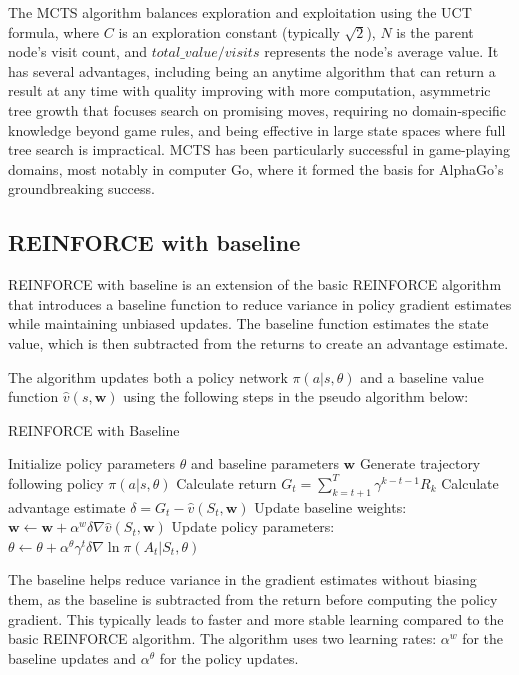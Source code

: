 \documentclass{article}
\begin{document}
The MCTS algorithm balances exploration and exploitation using the UCT formula, where $C$ is an exploration constant (typically $\sqrt{2}$), $N$ is the parent node's visit count, and $total\_value/visits$ represents the node's average value. 
It has several advantages, including being an anytime algorithm that can return a result at any time with quality improving with more computation, asymmetric tree growth that focuses search on promising moves, requiring no domain-specific knowledge beyond game rules, and being effective in large state spaces where full tree search is impractical. 
MCTS has been particularly successful in game-playing domains, most notably in computer Go, where it formed the basis for AlphaGo's groundbreaking success.



\subsection{REINFORCE with baseline}

REINFORCE with baseline is an extension of the basic REINFORCE algorithm that introduces a baseline function to reduce variance in policy gradient estimates while maintaining unbiased updates.
The baseline function estimates the state value, which is then subtracted from the returns to create an advantage estimate.

The algorithm updates both a policy network $\pi(a|s,\theta)$ and a baseline value function $\hat{v}(s,\mathbf{w})$ using the following steps in the pseudo algorithm below:

\begin{algorithm}
\caption{REINFORCE with Baseline}
\begin{algorithmic}[1]
\State Initialize policy parameters $\theta$ and baseline parameters $\mathbf{w}$
    \State Generate trajectory following policy $\pi(a|s,\theta)$
        \State Calculate return $G_t = \sum_{k=t+1}^T \gamma^{k-t-1}R_k$
        \State Calculate advantage estimate $\delta = G_t - \hat{v}(S_t,\mathbf{w})$
        \State Update baseline weights: $\mathbf{w} \leftarrow \mathbf{w} + \alpha^w \delta \nabla \hat{v}(S_t,\mathbf{w})$
        \State Update policy parameters: $\theta \leftarrow \theta + \alpha^\theta \gamma^t \delta \nabla \ln \pi(A_t|S_t,\theta)$
    \EndFor
\EndFor
\end{algorithmic}
\end{algorithm}

The baseline helps reduce variance in the gradient estimates without biasing them, as the baseline is subtracted from the return before computing the policy gradient.
This typically leads to faster and more stable learning compared to the basic REINFORCE algorithm. 
The algorithm uses two learning rates: $\alpha^w$ for the baseline updates and $\alpha^\theta$ for the policy updates.
\end{document}

